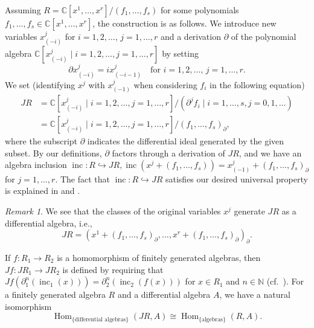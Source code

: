 \documentclass[a4paper, 12pt, reqno]{amsart}
\theoremstyle{remark}
\newtheorem{remark}[theorem]{Remark}
\DeclareMathOperator{\Hom}{Hom}
\DeclareMathOperator{\inc}{inc}
\begin{document}
Assuming $R = \mathbb{C}[x^1, \dots, x^r]/(f_1, \dots, f_s)$ for some polynomials $f_1, \dots, f_s \in \mathbb{C}[x^1, \dots, x^r]$, the construction is as follows.
We introduce new variables $x^j_{(-i)}$ for $i = 1, 2, \dots$, $j = 1, \dots, r$ and a derivation $\partial$ of the polynomial algebra $\mathbb{C}[x^j_{(-i)} \mid i = 1, 2, \dots, j = 1, \dots, r]$ by setting
\begin{equation*}
  \partial x^j_{(-i)} = ix^j_{(-i - 1)} \quad \text{for $i = 1, 2, \dots$, $j = 1, \dots, r$}.
\end{equation*}
We set (identifying $x^j$ with $x^j_{(-1)}$ when considering $f_i$ in the following equation)
\begin{align*}
  JR &= \mathbb{C}[x^j_{(-i)} \mid i = 1, 2, \dots, j = 1, \dots, r]/(\partial^jf_i \mid i = 1, \dots, s, j = 0, 1, \dots) \\
     &= \mathbb{C}[x^j_{(-i)} \mid i = 1, 2, \dots, j = 1, \dots, r]/(f_1, \dots, f_s)_\partial,
\end{align*}
where the subscript $\partial$ indicates the differential ideal generated by the given subset.
By our definitions, $\partial$ factors through a derivation of $JR$, and we have an algebra inclusion $\inc: R \hookrightarrow JR, \inc(x^j + (f_1, \dots, f_s)) = x^j_{(-1)} + (f_1, \dots, f_s)_\partial$ for $j = 1, \dots, r$.
The fact that $\inc: R \hookrightarrow JR$ satisfies our desired universal property is explained in \cite[\S2.3]{arakawa_remark_2012} and \cite{ein_jet_2008}.

\begin{remark}
  \label{rmk:4}
  We see that the classes of the original variables $x^j$ generate $JR$ as a differential algebra, i.e.,
  \begin{equation*}
    JR = (x^1 + (f_1, \dots, f_s)_\partial, \dots, x^r + (f_1, \dots, f_s)_\partial)_\partial.
  \end{equation*}
\end{remark}

If $f: R_1 \to R_2$ is a homomorphism of finitely generated algebras, then $Jf: JR_1 \to JR_2$ is defined by requiring that $Jf(\partial_1^n(\inc_1(x))) = \partial^n_2(\inc_2(f(x)))$ for $x \in R_1$ and $n \in \mathbb{N}$ (cf.\ ).
For a finitely generated algebra $R$ and a differential algebra $A$, we have a natural isomorphism
\begin{equation*}
  \Hom_{\{\text{differential algebras}\}}(JR, A) \cong \Hom_{\{\text{algebras}\}}(R, A).
\end{equation*}
\end{document}
